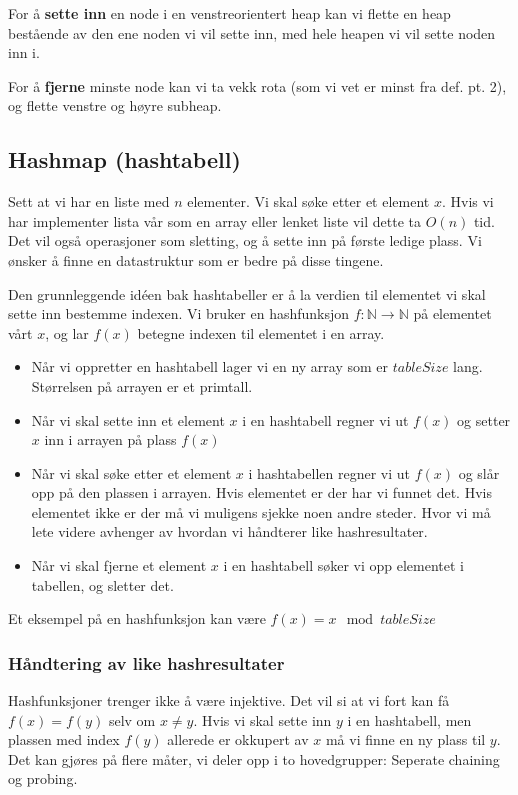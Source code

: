 For å \textbf{sette inn} en node i en venstreorientert heap kan vi flette en heap bestående av den ene noden vi vil sette inn, med hele heapen vi vil sette noden inn i.

For å \textbf{fjerne} minste node kan vi ta vekk rota (som vi vet er minst fra def. pt. 2), og flette venstre og høyre subheap.





\subsection{Hashmap (hashtabell)}
Sett at vi har en liste med $ n $ elementer. Vi skal søke etter et element $ x $. Hvis vi har implementer lista vår som en array eller lenket liste vil dette ta $ O(n) $ tid. Det vil også operasjoner som sletting, og å sette inn på første ledige plass. Vi ønsker å finne en datastruktur som er bedre på disse tingene. 

Den grunnleggende idéen bak hashtabeller er å la verdien til elementet vi skal sette inn bestemme indexen. Vi bruker en hashfunksjon $ f:\mathbb{N}\rightarrow\mathbb{N} $ på elementet vårt $ x $, og lar $ f(x) $ betegne indexen til elementet i en array. 

\begin{itemize}
\item Når vi oppretter en hashtabell lager vi en ny array som er $ tableSize $ lang. Størrelsen på arrayen er et primtall. 
\item Når vi skal sette inn et element $ x $ i en hashtabell regner vi ut $ f(x) $ og setter $ x $ inn i arrayen på plass $ f(x) $
\item Når vi skal søke etter et element $ x $ i hashtabellen regner vi ut $ f(x) $ og slår opp på den plassen i arrayen. Hvis elementet er der har vi funnet det. Hvis elementet ikke er der må vi muligens sjekke noen andre steder. Hvor vi må lete videre avhenger av hvordan vi håndterer like hashresultater. 
\item Når vi skal fjerne et element $ x $ i en hashtabell søker vi opp elementet i tabellen, og sletter det. 
\end{itemize}

\noindent Et eksempel på en hashfunksjon kan være $ f(x) = x \mod tableSize $


\subsubsection{Håndtering av like hashresultater}
Hashfunksjoner trenger ikke å være injektive. Det vil si at vi fort kan få $ f(x) = f(y) $ selv om $ x \neq y $. Hvis vi skal sette inn $ y $ i en hashtabell, men plassen med index $ f(y) $ allerede er okkupert av $ x $ må vi finne en ny plass til $ y $. Det kan gjøres på flere måter, vi deler opp i to hovedgrupper: Seperate chaining og probing. 


